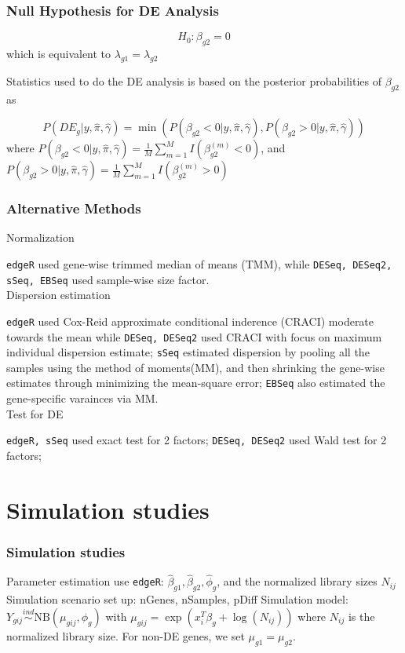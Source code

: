 \documentclass[handout,10pt]{beamer}
\newcommand{\ind}{\stackrel{ind}{\sim}}
\begin{document}
\begin{frame}
\frametitle{Null Hypothesis for DE Analysis}

$$H_0: \beta_{g2}=0$$ which is equivalent to $\lambda_{g1}=\lambda_{g2}$

Statistics used to do the DE analysis is based on the posterior probabilities of $\beta_{g2}$ as

$$P(DE_g|y, \hat{\pi}, \hat{\gamma}) = \min(P(\beta_{g2}<0|y, \hat{\pi}, \hat{\gamma}), P(\beta_{g2}>0|y, \hat{\pi}, \hat{\gamma}))$$
where $P(\beta_{g2}<0|y, \hat{\pi}, \hat{\gamma}) = \frac{1}{M}\sum_{m=1}^M I(\beta_{g2}^{(m)} < 0)$, and $P(\beta_{g2}>0|y, \hat{\pi}, \hat{\gamma}) = \frac{1}{M}\sum_{m=1}^M I(\beta_{g2}^{(m)} > 0)$



\end{frame}

\begin{frame}
\frametitle{Alternative Methods}

Normalization

{\tt edgeR} used gene-wise trimmed median of means (TMM), while {\tt DESeq, DESeq2, sSeq, EBSeq} used sample-wise size factor. \\

Dispersion estimation

{\tt edgeR} used Cox-Reid approximate conditional inderence (CRACI) moderate towards the mean while {\tt DESeq, DESeq2} used CRACI with focus on maximum individual dispersion estimate; {\tt sSeq} estimated dispersion by pooling all the samples using the method of moments(MM), and then shrinking the gene-wise estimates through minimizing the mean-square error; {\tt EBSeq} also estimated the gene-specific varainces via MM. \\


Test for DE

{\tt edgeR, sSeq} used exact test for 2 factors; {\tt DESeq, DESeq2} used Wald test for 2 factors; 

\end{frame}

\section{Simulation studies}


\begin{frame}
\frametitle{Simulation studies}

Parameter estimation use {\tt edgeR}: $\hat{\beta}_{g1}, \hat{\beta}_{g2}, \hat{\phi}_g$, and the normalized library sizes $N_{ij}$
\newline
\newline
Simulation scenario set up: nGenes, nSamples, pDiff
\newline
\newline
Simulation model: $Y_{gij} \ind \text{NB} \left (\mu_{gij}, \phi_g \right )$ with $\mu_{gij} = \exp(x_i^T\beta_g + \log(N_{ij}))$ where $N_{ij}$ is the normalized library size. For non-DE genes, we set $\mu_{g1} = \mu_{g2}$. 

\end{frame}
\end{document}
